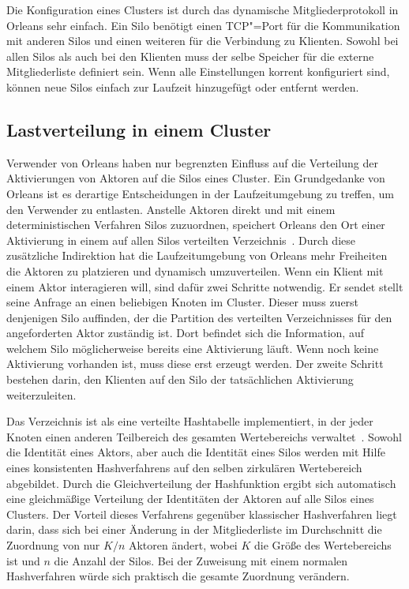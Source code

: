 Die Konfiguration eines Clusters ist durch das dynamische Mitgliederprotokoll in Orleans sehr einfach. Ein Silo benötigt einen TCP"=Port für die Kommunikation mit anderen Silos und einen weiteren für die Verbindung zu Klienten. Sowohl bei allen Silos als auch bei den Klienten muss der selbe Speicher für die externe Mitgliederliste definiert sein. Wenn alle Einstellungen korrent konfiguriert sind, können neue Silos einfach zur Laufzeit hinzugefügt oder entfernt werden.

\subsection{Lastverteilung in einem Cluster}

Verwender von Orleans haben nur begrenzten Einfluss auf die Verteilung der Aktivierungen von Aktoren auf die Silos eines Cluster. Ein Grundgedanke von Orleans ist es derartige Entscheidungen in der Laufzeitumgebung zu treffen, um den Verwender zu entlasten. Anstelle Aktoren direkt und mit einem deterministischen Verfahren Silos zuzuordnen, speichert Orleans den Ort einer Aktivierung in einem auf allen Silos verteilten Verzeichnis~\cite[5]{virtualActors}. Durch diese zusätzliche Indirektion hat die Laufzeitumgebung von Orleans mehr Freiheiten die Aktoren zu platzieren und dynamisch umzuverteilen. Wenn ein Klient mit einem Aktor interagieren will, sind dafür zwei Schritte notwendig. Er sendet stellt seine Anfrage an einen beliebigen Knoten im Cluster. Dieser muss zuerst denjenigen Silo auffinden, der die Partition des verteilten Verzeichnisses für den angeforderten Aktor zuständig ist. Dort befindet sich die Information, auf welchem Silo möglicherweise bereits eine Aktivierung läuft. Wenn noch keine Aktivierung vorhanden ist, muss diese erst erzeugt werden. Der zweite Schritt bestehen darin, den Klienten auf den Silo der tatsächlichen Aktivierung weiterzuleiten.

Das Verzeichnis ist als eine verteilte Hashtabelle implementiert, in der jeder Knoten einen anderen Teilbereich des gesamten Wertebereichs verwaltet~\cite{Stoica:2001:CSP:383059.383071}. Sowohl die Identität eines Aktors, aber auch die Identität eines Silos werden mit Hilfe eines konsistenten Hashverfahrens auf den selben zirkulären Wertebereich abgebildet. Durch die Gleichverteilung der Hashfunktion ergibt sich automatisch eine gleichmäßige Verteilung der Identitäten der Aktoren auf alle Silos eines Clusters. Der Vorteil dieses Verfahrens gegenüber klassischer Hashverfahren liegt darin, dass sich bei einer Änderung in der Mitgliederliste im Durchschnitt die Zuordnung von nur $K/n$ Aktoren ändert, wobei $K$ die Größe des Wertebereichs ist und $n$ die Anzahl der Silos. Bei der Zuweisung mit einem normalen Hashverfahren würde sich praktisch die gesamte Zuordnung verändern.

